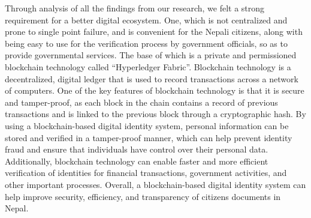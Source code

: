 Through analysis of all the findings from our research, we felt a strong requirement for a better digital ecosystem. One, which is not centralized and prone to single point failure, and is convenient for the Nepali citizens, along with being easy to use for the verification process by government officials, so as to provide governmental services. The base of which is a private and permissioned blockchain technology called “Hyperledger Fabric”. Blockchain technology is a decentralized, digital ledger that is used to record transactions across a network of computers. One of the key features of blockchain technology is that it is secure and tamper-proof, as each block in the chain contains a record of previous transactions and is linked to the previous block through a cryptographic hash. By using a blockchain-based digital identity system, personal information can be stored and verified in a tamper-proof manner, which can help prevent identity fraud and ensure that individuals have control over their personal data. Additionally, blockchain technology can enable faster and more efficient verification of identities for financial transactions, government activities, and other important processes. Overall, a blockchain-based digital identity system can help improve security, efficiency, and transparency of citizens documents in Nepal. 

